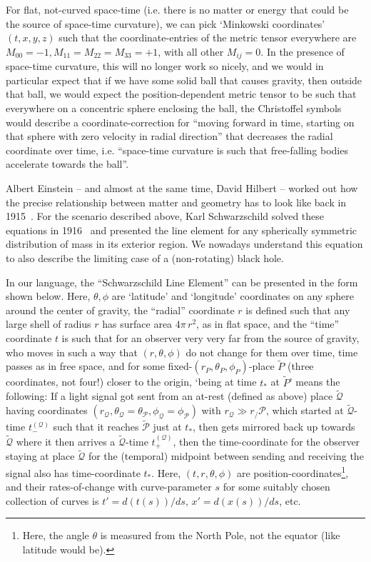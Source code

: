\documentclass[twocolumn]{article}
\begin{document}
For flat, not-curved space-time (i.e. there is no matter or energy
that could be the source of space-time curvature), we can pick
`Minkowski coordinates' $(t,x,y,z)$ such that the coordinate-entries
of the metric tensor everywhere are $M_{00}=-1,
M_{11}=M_{22}=M_{33}=+1$, with all other $M_{ij}=0$. In the presence
of space-time curvature, this will no longer work so nicely, and we
would in particular expect that if we have some solid ball that causes
gravity, then outside that ball, we would expect the
position-dependent metric tensor to be such that everywhere on a
concentric sphere enclosing the ball, the Christoffel symbols would
describe a coordinate-correction for ``moving forward in time,
starting on that sphere with zero velocity in radial direction'' that
decreases the radial coordinate over time, i.e. ``space-time curvature
is such that free-falling bodies accelerate towards the ball''.

Albert Einstein -- and almost at the same time, David Hilbert --
worked out how the precise relationship between matter and geometry
has to look like back in
1915~\cite{einstein1915feldgleichungen,hilbert1915grundlagen}. For the
scenario described above, Karl Schwarzschild solved these equations in
1916~\cite{schwarzschild1916gravitationsfeld} and presented the line
element for any spherically symmetric distribution of mass in its
exterior region. We nowadays understand this equation to also describe
the limiting case of a (non-rotating) black hole.

In our language, the ``Schwarzschild Line Element'' can be presented
in the form shown below. Here, $\theta, \phi$ are `latitude' and
`longitude' coordinates on any sphere around the center of gravity,
the ``radial'' coordinate $r$ is defined such that any large shell of
radius $r$ has surface area $4\pi\,r^2$, as in flat space, and the
``time'' coordinate $t$ is such that for an observer very very far
from the source of gravity, who moves in such a way that
$(r,\theta,\phi)$ do not change for them over time, time passes as in
free space, and for some fixed-$(r_P,\theta_P,\phi_P)$-place $\tilde
P$ (three coordinates, not four!) closer to the origin, `being at time
$t_*$ at $\tilde P$' means the following: If a light signal got sent
from an at-rest (defined as above) place $\tilde {\mathcal Q}$
having coordinates
$(r_{\mathcal Q},\theta_{\mathcal Q}=\theta_{\mathcal P},\phi_{\mathcal Q}=\phi_{\mathcal P })$ with $r_{\mathcal Q}\gg r_/{\mathcal P}$, which
started at $\tilde {\mathcal Q}$-time $t^{({\mathcal Q})}_-$ such that it reaches $\tilde {\mathcal P}$
just at $t_*$, then gets mirrored back up towards $\tilde {\mathcal Q}$ where it
then arrives a $\tilde {\mathcal Q}$-time $t^{({\mathcal Q})}_+$, then the time-coordinate
for the observer staying at place $\tilde {\mathcal Q}$ for the (temporal)
midpoint between sending and receiving the signal also has
time-coordinate $t_*$. Here, $(t,r,\theta,\phi)$ are
position-coordinates\footnote{Here, the angle $\theta$ is measured
from the North Pole, not the equator (like latitude would be).},
and their rates-of-change with curve-parameter $s$ for some suitably
chosen collection of curves is $t'=d(t(s))/ds,\,x'=d(x(s))/ds$, etc.
\end{document}
